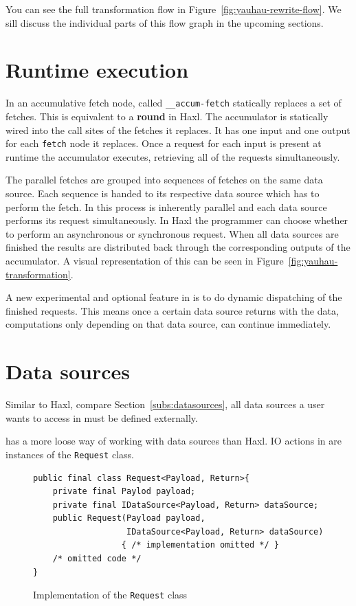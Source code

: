 You can see the full \yauhau{} transformation flow in Figure~\ref{fig:yauhau-rewrite-flow}.
We sill discuss the individual parts of this flow graph in the upcoming sections.

\section{Runtime execution}

In \yauhau{} an accumulative fetch node, called \texttt{\_\_accum-fetch} statically replaces a set of fetches.
This is equivalent to a \textbf{round} in Haxl.
The accumulator is statically wired into the call sites of the fetches it replaces.
It has one input and one output for each \texttt{fetch} node it replaces.
Once a request for each input is present at runtime the accumulator executes, retrieving all of the requests simultaneously.

The parallel fetches are grouped into sequences of fetches on the same data source.
Each sequence is handed to its respective data source which has to perform the fetch.
In \yauhau{} this process is inherently parallel and each data source performs its request simultaneously.
In Haxl the programmer can choose whether to perform an asynchronous or synchronous request.
When all data sources are finished the results are distributed back through the corresponding outputs of the accumulator.
A visual representation of this can be seen in Figure~\ref{fig:yauhau-transformation}.

A new experimental and optional feature in \yauhau{} is to do dynamic dispatching of the finished requests.
This means once a certain data source returns with the data, computations only depending on that data source, can continue immediately.

\section{Data sources}

Similar to Haxl, compare Section~\ref{subs:datasources}, all data sources a user wants to access in \yauhau{} must be defined externally.

\yauhau{} has a more loose way of working with data sources than Haxl.
IO actions in \yauhau{} are instances of the \texttt{Request} class.

\begin{figure}[h]
\begin{verbatim}
public final class Request<Payload, Return>{
    private final Paylod payload;
    private final IDataSource<Payload, Return> dataSource;
    public Request(Payload payload,
                   IDataSource<Payload, Return> dataSource)
                  { /* implementation omitted */ }
    /* omitted code */
}
\end{verbatim}
\caption{Implementation of the \texttt{Request} class}
\label{fig:request-class-implementation}
\end{figure}

